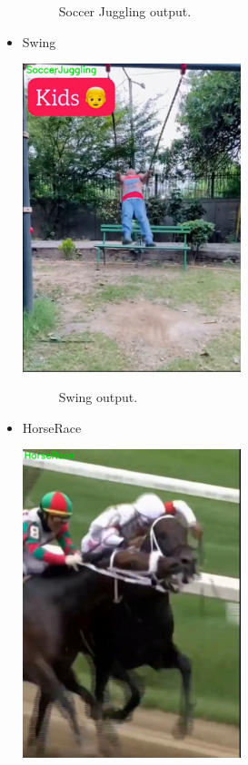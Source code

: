 \begin{itemize}
\begin{figure}[h!]
    	\caption[Soccer Juggling output .]{Soccer Juggling output.}
    	\label{soccer_conv.png} 
        \end{figure}
    \item Swing

        \includegraphics[width=0.5\textwidth]{Figures/swing_conv.png}
        \begin{figure}[h!]
    	\centering
    	
    	\caption[Swing output .]{Swing output.}
    	\label{swing_conv.png} 
        \end{figure}
        
    \item HorseRace

        \includegraphics[width=0.5\textwidth]{Figures/race_conv.png}
        \begin{figure}[h!]
    	\centering
    	

\end{figure}
\end{itemize}
